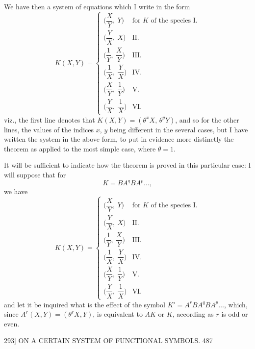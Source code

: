 \documentclass[11pt]{article}
\begin{document}
We have then a system of equations which I write in the form
\[ K(X,Y) = \left\{
\begin{array}{ll}
\bigl(\dfrac{X}{Y},\ Y\bigr) & \text{for } K \text{ of the species I.} \\[8pt]
\bigl(\dfrac{Y}{X},\ X\bigr) & \text{II.} \\[8pt]
\bigl(\dfrac{1}{Y},\ \dfrac{X}{Y}\bigr) & \text{III.} \\[8pt]
\bigl(\dfrac{1}{X},\ \dfrac{Y}{X}\bigr) & \text{IV.} \\[8pt]
\bigl(\dfrac{X}{Y},\ \dfrac{1}{Y}\bigr) & \text{V.} \\[8pt]
\bigl(\dfrac{Y}{X},\ \dfrac{1}{X}\bigr) & \text{VI.}
\end{array}
\right. \]
viz., the first line denotes that $K(X,Y)=(\theta^{x}X,\,\theta^{y}Y)$, and so for the other lines, the
values of the indices $x$, $y$ being different in the several cases, but I have written
the system in the above form, to put in evidence more distinctly the theorem as
applied to the most simple case, where $\theta=1$.

It will be sufficient to indicate how the theorem is proved in this particular case:
I will suppose that for
\[ K=BA^{q}BA^{p}\ldots, \]
we have
\[ K(X,Y) = \left\{
\begin{array}{ll}
\bigl(\dfrac{X}{Y},\ Y\bigr) & \text{for } K \text{ of the species I.} \\[8pt]
\bigl(\dfrac{Y}{X},\ X\bigr) & \text{II.} \\[8pt]
\bigl(\dfrac{1}{Y},\ \dfrac{X}{Y}\bigr) & \text{III.} \\[8pt]
\bigl(\dfrac{1}{X},\ \dfrac{Y}{X}\bigr) & \text{IV.} \\[8pt]
\bigl(\dfrac{X}{Y},\ \dfrac{1}{Y}\bigr) & \text{V.} \\[8pt]
\bigl(\dfrac{Y}{X},\ \dfrac{1}{X}\bigr) & \text{VI.}
\end{array}
\right. \]
and let it be inquired what is the effect of the symbol $K'=A^{r}BA^{q}BA^{p}\ldots$, which,
since $A^{r}(X,Y)=(\theta^{r}X,Y)$, is equivalent to $AK$ or $K$, according as $r$ is odd or even.

\newpage
\begin{center}
\textsc{293]} \hfill ON A CERTAIN SYSTEM OF FUNCTIONAL SYMBOLS. \hfill 487
\end{center}
\end{document}
